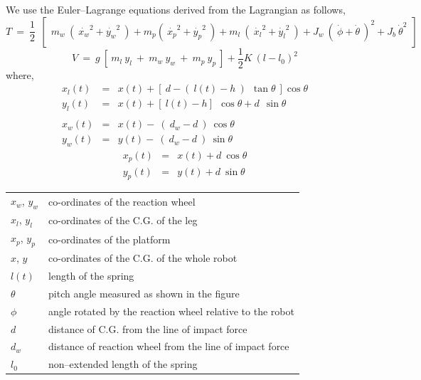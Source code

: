 We use the Euler--Lagrange equations derived from the Lagrangian as follows,
\begin{equation}
 T \:=\: \frac{1}{2}\:\:\left[\:\:m_w\:(\:\dot{x_w}^2 + \dot{y_w}^2\:) + m_p (\:\dot{x_p}^2 + \dot{y_p}^2\:)
  + m_l\:(\:\dot{x_l}^2 + \dot{y_l}^2\:) +  J_w\:(\:\dot{\phi} + \dot{\theta}\:)^2
  + J_b\:\dot{\theta}^2\:\:\right]
\end{equation}
\begin{equation}
V\:=\: g\:\left[\: m_l\:y_l\:+\: m_w\:y_w\:+\: m_p\:y_p\:\right] + \frac{1}{2}K\:(l - l_0)^2
\end{equation}
where,
\begin{eqnarray*}
x_l(t) &=& x(t) + \left[\:d - (\:l(t)- h\:)\:\:\tan \theta\:\right]\cos \theta\\
y_l(t) &=& x(t) + \left[\:l(t) - h \right]\:\:\cos \theta + d\:\:\sin \theta\\
\\
x_w(t) &=& x(t) - \:(\:d_w - d\:)\: \cos \theta\\
y_w(t) &=& y(t) - \:(\:d_w - d\:)\: \sin \theta
\end{eqnarray*}
\begin{eqnarray*}
x_p(t) &=& x(t) + d\: \cos \theta\\
y_p(t) &=& y(t) + d\: \sin \theta
\end{eqnarray*}

\vspace{0.2in}
\begin{tabular}{l @{ : } l}
$x_w$, $y_w$ & co-ordinates of the reaction wheel\\
$x_l$, $y_l$ & co-ordinates of the C.G. of the leg\\
$x_p$, $y_p$ & co-ordinates of the platform\\
$x$, $y$ & co-ordinates of the C.G. of the whole robot\\
$l(t)$ & length of the spring\\
$\theta$ & pitch angle measured as shown in the figure\\
$\phi$ & angle rotated by the reaction wheel relative to the robot\\
$d$ & distance of C.G. from the line of impact force\\
$d_w$ & distance of reaction wheel from the line of impact force\\
$l_0$ & non--extended length of the spring
\end{tabular}
\vspace{0.2in}

